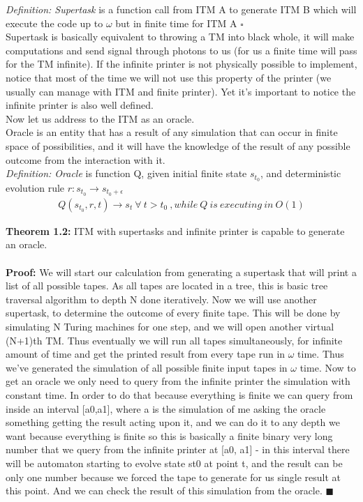\documentclass{article}
\begin{document}
\textit{Definition: Supertask} is a function call from ITM A to generate ITM B which will execute the code up to $\omega$ but in finite time for ITM A $\square$ \\

Supertask is basically equivalent to throwing a TM into black whole, it will make computations and send signal through photons to us (for us a finite time will pass for the TM infinite). If the infinite printer is not physically possible to implement, notice that most of the time we will not use this property of the printer (we usually can manage with ITM and finite printer). Yet it's important to notice the infinite printer is also well defined. \\

Now let us address to the ITM as an oracle. \\

 Oracle is an entity that has a result of any simulation that can occur in finite space of possibilities, and it will have the knowledge of the result of any possible outcome from the interaction with it. \\ 

\textit{Definition: Oracle} is function Q, given initial finite state $s_{t_{0}}$, and deterministic evolution rule $r:s_{t_{0}} \to s_{t_{0}+\epsilon}$
\begin{align*}
Q(s_{t_{0}}, r, t) \to s_{t} \ \forall \ t > t_{0} \ ,while \ Q \ is \ executing \ in \ O(1) 
\end{align*}

\textbf{Theorem 1.2:} ITM with supertasks and infinite printer is capable to generate an oracle. \\\\
\textbf{Proof:} We will start our calculation from generating a supertask that will print a list of all possible tapes. As all tapes are located in a tree, this is basic tree traversal algorithm to depth N done iteratively. Now we will use another supertask, to determine the outcome of every finite tape. This will be done by simulating N Turing machines for one step, and we will open another virtual (N+1)th TM. Thus eventually we will run all tapes simultaneously, for infinite amount of time and get the printed result from every tape run in $\omega$ time. Thus we've generated the simulation of all possible finite input tapes in $\omega$ time. Now to get an oracle we only need to query from the infinite printer the simulation with constant time. In order to do that because everything is finite we can query from inside an interval [a0,a1], where a is the simulation of me asking the oracle something getting the result acting upon it, and we can do it to any depth we want because everything is finite so this is basically a finite binary very long number that we query from the infinite printer at [a0, a1] - in this interval there will be automaton starting to evolve state st0 at point t, and the result can be only one number because we forced the tape to generate for us single result at this point. And we can check the result of this simulation from the oracle. 
 $\blacksquare$ \\
\end{document}
